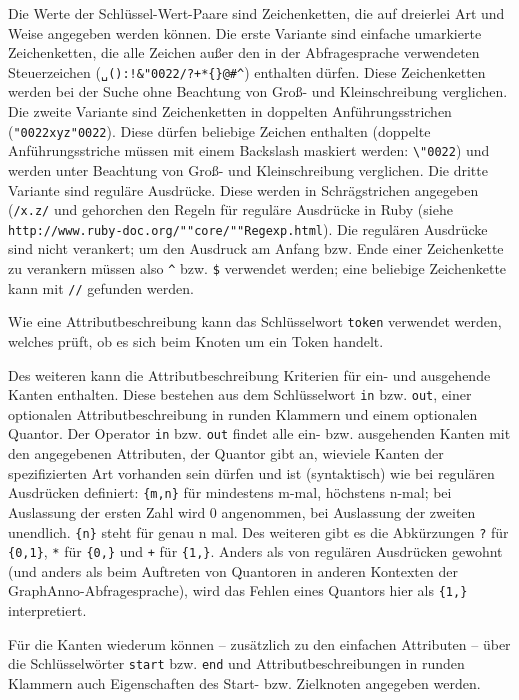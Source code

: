 \documentclass[12pt]{scrartcl}
\newcommand{\quo}{\char"0022}
\begin{document}
\label{zeichenketten}Die Werte der Schlüssel-Wert-Paare sind Zeichenketten, die auf dreierlei Art und Weise angegeben werden können. Die erste Variante sind einfache umarkierte Zeichenketten, die alle Zeichen außer den in der Abfragesprache verwendeten Steuerzeichen (\texttt{␣():!\&\quo/?+*\{\}@\#\^{}}) enthalten dürfen. Diese Zeichenketten werden bei der Suche ohne Beachtung von Groß- und Kleinschreibung verglichen.
Die zweite Variante sind Zeichenketten in doppelten Anführungsstrichen (\texttt{{\quo}xyz\quo}). Diese dürfen beliebige Zeichen enthalten (doppelte Anführungsstriche müssen mit einem Backslash maskiert werden: \texttt{\textbackslash\quo}) und werden unter Beachtung von Groß- und Kleinschreibung verglichen.
Die dritte Variante sind reguläre Ausdrücke. Diese werden in Schrägstrichen angegeben (\texttt{/x.z/} und gehorchen den Regeln für reguläre Ausdrücke in Ruby (siehe \texttt{http://www.ruby-doc.org/""core/""Regexp.html}). Die regulären Ausdrücke sind nicht verankert; um den Ausdruck am Anfang bzw. Ende einer Zeichenkette zu verankern müssen also \texttt{\^} bzw. \texttt{\$} verwendet werden; eine beliebige Zeichenkette kann mit \texttt{//} gefunden werden.

Wie eine Attributbeschreibung kann das Schlüsselwort \texttt{token} verwendet werden, welches prüft, ob es sich beim Knoten um ein Token handelt.

Des weiteren kann die Attributbeschreibung Kriterien für ein- und ausgehende Kanten enthalten. Diese bestehen aus dem Schlüsselwort \texttt{in} bzw. \texttt{out}, einer optionalen Attributbeschreibung in runden Klammern und einem optionalen Quantor. Der Operator \texttt{in} bzw. \texttt{out} findet alle ein- bzw. ausgehenden Kanten mit den angegebenen Attributen, der Quantor gibt an, wieviele Kanten der spezifizierten Art vorhanden sein dürfen und ist (syntaktisch) wie bei regulären Ausdrücken definiert: \texttt{\{m,n\}} für mindestens m-mal, höchstens n-mal; bei Auslassung der ersten Zahl wird 0 angenommen, bei Auslassung der zweiten unendlich. \texttt{\{n\}} steht für genau n mal. Des weiteren gibt es die Abkürzungen \texttt{?} für \texttt{\{0,1\}}, \texttt{*} für \texttt{\{0,\}} und \texttt{+} für \texttt{\{1,\}}.
Anders als von regulären Ausdrücken gewohnt (und anders als beim Auftreten von Quantoren in anderen Kontexten der GraphAnno-Abfragesprache), wird das Fehlen eines Quantors hier als \texttt{\{1,\}} interpretiert.

Für die Kanten wiederum können – zusätzlich zu den einfachen Attributen – über die Schlüsselwörter \texttt{start} bzw. \texttt{end} und Attributbeschreibungen in runden Klammern auch Eigenschaften des Start- bzw. Zielknoten angegeben werden.
\end{document}
